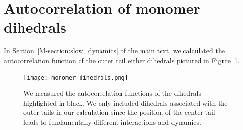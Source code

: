 \documentclass{article}
\begin{document}
  \section{Autocorrelation of monomer dihedrals}
  
  In Section~\ref{M-section:slow_dynamics} of the main text, we calculated the
  autocorrelation function of the outer tail either dihedrals pictured
  in Figure~\ref{fig:dihedrals}.
  
  \begin{figure}[!htb]
  \centering
  \texttt{[image: monomer\_dihedrals.png]}
  \caption{We measured the autocorrelation functions of the dihedrals highlighted in
  black. We only included dihedrals associated with the outer tails in our calculation
  since the position of the center tail leads to fundamentally different interactions and
  dynamics.}\label{fig:dihedrals}
  \end{figure}
  

\clearpage

\end{document}
